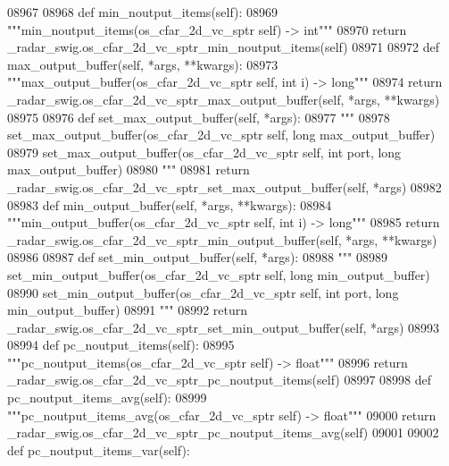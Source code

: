 \begin{DoxyCode}
{{{{{{{{{{{{{{{{{{{{{{{{{{{{{08967 
08968     \textcolor{keyword}{def }min_noutput_items(self):
08969         \textcolor{stringliteral}{"""min\_noutput\_items(os\_cfar\_2d\_vc\_sptr self) -> int"""}
08970         \textcolor{keywordflow}{return} \_radar\_swig.os\_cfar\_2d\_vc\_sptr\_min\_noutput\_items(self)
08971 
08972     \textcolor{keyword}{def }max_output_buffer(self, *args, **kwargs):
08973         \textcolor{stringliteral}{"""max\_output\_buffer(os\_cfar\_2d\_vc\_sptr self, int i) -> long"""}
08974         \textcolor{keywordflow}{return} \_radar\_swig.os\_cfar\_2d\_vc\_sptr\_max\_output\_buffer(self, *args, **kwargs)
08975 
08976     \textcolor{keyword}{def }set_max_output_buffer(self, *args):
08977         \textcolor{stringliteral}{"""}
08978 \textcolor{stringliteral}{        set\_max\_output\_buffer(os\_cfar\_2d\_vc\_sptr self, long max\_output\_buffer)}
08979 \textcolor{stringliteral}{        set\_max\_output\_buffer(os\_cfar\_2d\_vc\_sptr self, int port, long max\_output\_buffer)}
08980 \textcolor{stringliteral}{        """}
08981         \textcolor{keywordflow}{return} \_radar\_swig.os\_cfar\_2d\_vc\_sptr\_set\_max\_output\_buffer(self, *args)
08982 
08983     \textcolor{keyword}{def }min_output_buffer(self, *args, **kwargs):
08984         \textcolor{stringliteral}{"""min\_output\_buffer(os\_cfar\_2d\_vc\_sptr self, int i) -> long"""}
08985         \textcolor{keywordflow}{return} \_radar\_swig.os\_cfar\_2d\_vc\_sptr\_min\_output\_buffer(self, *args, **kwargs)
08986 
08987     \textcolor{keyword}{def }set_min_output_buffer(self, *args):
08988         \textcolor{stringliteral}{"""}
08989 \textcolor{stringliteral}{        set\_min\_output\_buffer(os\_cfar\_2d\_vc\_sptr self, long min\_output\_buffer)}
08990 \textcolor{stringliteral}{        set\_min\_output\_buffer(os\_cfar\_2d\_vc\_sptr self, int port, long min\_output\_buffer)}
08991 \textcolor{stringliteral}{        """}
08992         \textcolor{keywordflow}{return} \_radar\_swig.os\_cfar\_2d\_vc\_sptr\_set\_min\_output\_buffer(self, *args)
08993 
08994     \textcolor{keyword}{def }pc_noutput_items(self):
08995         \textcolor{stringliteral}{"""pc\_noutput\_items(os\_cfar\_2d\_vc\_sptr self) -> float"""}
08996         \textcolor{keywordflow}{return} \_radar\_swig.os\_cfar\_2d\_vc\_sptr\_pc\_noutput\_items(self)
08997 
08998     \textcolor{keyword}{def }pc_noutput_items_avg(self):
08999         \textcolor{stringliteral}{"""pc\_noutput\_items\_avg(os\_cfar\_2d\_vc\_sptr self) -> float"""}
09000         \textcolor{keywordflow}{return} \_radar\_swig.os\_cfar\_2d\_vc\_sptr\_pc\_noutput\_items\_avg(self)
09001 
09002     \textcolor{keyword}{def }pc_noutput_items_var(self):
}}}}}}}}}}}}}}}}}}}}}}}}}}}}}
\end{DoxyCode}
